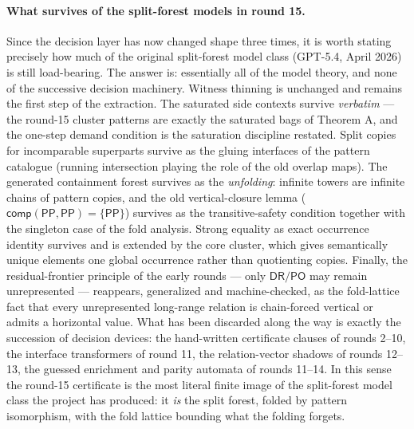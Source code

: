 \documentclass[
]{ceurart}
\theoremstyle{definition}
\newcommand{\DR}{\ensuremath{\mathsf{DR}}}
\newcommand{\PO}{\ensuremath{\mathsf{PO}}}
\newcommand{\PP}{\ensuremath{\mathsf{PP}}}
\newcommand{\comp}{\ensuremath{\mathsf{comp}}}
\begin{document}
\paragraph{What survives of the split-forest models in round 15.}
Since the decision layer has now changed shape three times, it is worth
stating precisely how much of the original split-forest model class
(GPT-5.4, April 2026) is still load-bearing.  The answer is: essentially
all of the model theory, and none of the successive decision machinery.
Witness thinning is unchanged and remains the first step of the
extraction.  The saturated side contexts survive \emph{verbatim} --- the
round-15 cluster patterns are exactly the saturated bags of Theorem A,
and the one-step demand condition is the saturation discipline restated.
Split copies for incomparable superparts survive as the gluing
interfaces of the pattern catalogue (running intersection playing the
role of the old overlap maps).  The generated containment forest
survives as the \emph{unfolding}: infinite towers are infinite chains of
pattern copies, and the old vertical-closure lemma
($\comp(\PP,\PP)=\{\PP\}$) survives as the transitive-safety condition
together with the singleton case of the fold analysis.  Strong equality
as exact occurrence identity survives and is extended by the core
cluster, which gives semantically unique elements one global occurrence
rather than quotienting copies.  Finally, the residual-frontier
principle of the early rounds --- only $\DR/\PO$ may remain
unrepresented --- reappears, generalized and machine-checked, as the
fold-lattice fact that every unrepresented long-range relation is
chain-forced vertical or admits a horizontal value.  What has been
discarded along the way is exactly the succession of decision devices:
the hand-written certificate clauses of rounds 2--10, the interface
transformers of round 11, the relation-vector shadows of rounds 12--13,
the guessed enrichment and parity automata of rounds 11--14.  In this
sense the round-15 certificate is the most literal finite image of the
split-forest model class the project has produced: it \emph{is} the
split forest, folded by pattern isomorphism, with the fold lattice
bounding what the folding forgets.
\end{document}
